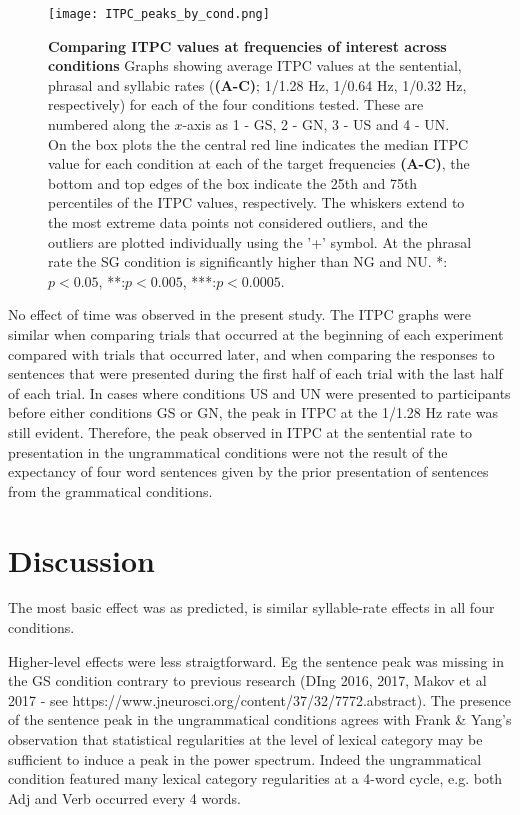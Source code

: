 \documentclass[a4paper,10pt,twoside]{article}
\begin{document}
{\begin{figure}[tbp]
\texttt{[image: ITPC\_peaks\_by\_cond.png]}
\caption{\textbf{Comparing ITPC values at frequencies of interest
    across conditions} Graphs showing average ITPC values at the
  sentential, phrasal and syllabic rates (\textbf{(A-C)}; 1/1.28 Hz,
  1/0.64 Hz, 1/0.32 Hz, respectively) for each of the four conditions
  tested. These are numbered along the $x$-axis as 1 - GS, 2 - GN, 3 -
  US and 4 - UN.  On the box plots the the central red line indicates
  the median ITPC value for each condition at each of the target
  frequencies \textbf{(A-C)}, the bottom and top edges of the box
  indicate the 25th and 75th percentiles of the ITPC values,
  respectively. The whiskers extend to the most extreme data points
  not considered outliers, and the outliers are plotted individually
  using the '+' symbol.  At the phrasal rate the SG condition is
  significantly higher than NG and NU. *:$p<0.05$, **:$p<0.005$,
  ***:$p<0.0005$. }
\label{ITPC_peaks}
\end{figure}

No effect of time was observed in the present study. The ITPC graphs
were similar when comparing trials that occurred at the beginning of
each experiment compared with trials that occurred later, and when
comparing the responses to sentences that were presented during the
first half of each trial with the last half of each trial. In cases
where conditions US and UN were presented to participants before
either conditions GS or GN, the peak in ITPC at the 1/1.28 Hz rate was
still evident. Therefore, the peak observed in ITPC at the sentential
rate to presentation in the ungrammatical conditions were not the
result of the expectancy of four word sentences given by the prior
presentation of sentences from the grammatical conditions.

\section*{Discussion}

The most basic effect was as predicted, is similar syllable-rate
effects in all four conditions.

Higher-level effects were less straigtforward. Eg the sentence peak
was missing in the GS condition contrary to previous research (DIng
2016, 2017, Makov et al 2017 - see
https://www.jneurosci.org/content/37/32/7772.abstract). The presence
of the sentence peak in the ungrammatical conditions agrees with Frank
& Yang's observation that statistical regularities at the level of
lexical category may be sufficient to induce a peak in the power
spectrum. Indeed the ungrammatical condition featured many lexical
category regularities at a 4-word cycle, e.g. both Adj and Verb
occurred every 4 words.

}
\end{document}
